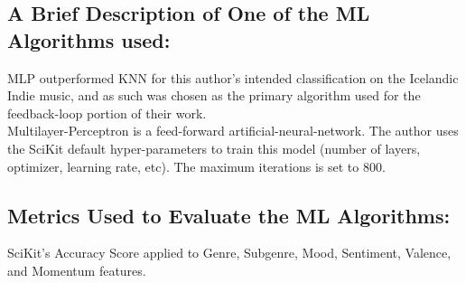 \documentclass[]{article}
\begin{document}
\subsection*{A Brief Description of One of the ML Algorithms used:}
MLP outperformed KNN for this author's intended classification on the Icelandic Indie music, and as such was chosen as the primary algorithm used for the feedback-loop portion of their work. \\
Multilayer-Perceptron is a feed-forward artificial-neural-network. The author uses the SciKit default hyper-parameters to train this model (number of layers, optimizer, learning rate, etc). The maximum iterations is set to 800.

\subsection*{Metrics Used to Evaluate the ML Algorithms:}
SciKit's Accuracy Score applied to Genre, Subgenre, Mood, Sentiment, Valence, and Momentum features. 
\end{document}
